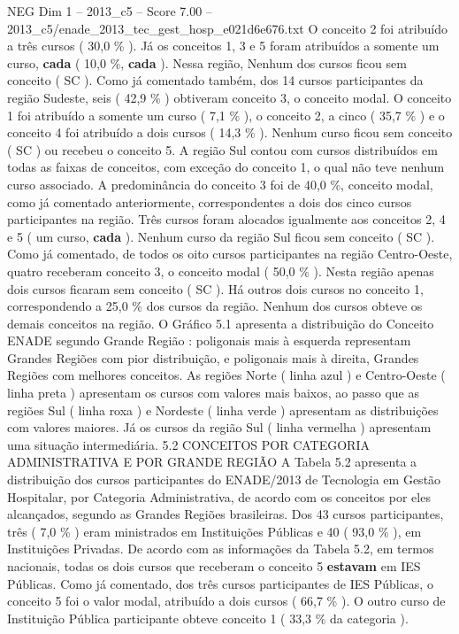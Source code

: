 \begin{textsample}{NEG Dim 1 – 2013\_c5 – Score 7.00 – 2013\_c5/enade\_2013\_tec\_gest\_hosp\_e021d6e676.txt}
O conceito 2 foi atribuído a três cursos ( 30,0 \% ).
Já os conceitos 1, 3 e 5 foram atribuídos a somente um curso, \textbf{cada} ( 10,0 \%, \textbf{cada} ).
Nessa região, Nenhum dos cursos ficou sem conceito ( SC ).
Como já comentado também, dos 14 cursos participantes da região Sudeste, seis ( 42,9 \% ) obtiveram conceito 3, o conceito modal.
O conceito 1 foi atribuído a somente um curso ( 7,1 \% ), o conceito 2, a cinco ( 35,7 \% ) e o conceito 4 foi atribuído a dois cursos ( 14,3 \% ).
Nenhum curso ficou sem conceito ( SC ) ou recebeu o conceito 5.
A região Sul contou com cursos distribuídos em todas as faixas de conceitos, com exceção do conceito 1, o qual não teve nenhum curso associado.
A predominância do conceito 3 foi de 40,0 \%, conceito modal, como já comentado anteriormente, correspondentes a dois dos cinco cursos participantes na região.
Três cursos foram alocados igualmente aos conceitos 2, 4 e 5 ( um curso, \textbf{cada} ).
Nenhum curso da região Sul ficou sem conceito ( SC ).
Como já comentado, de todos os oito cursos participantes na região Centro-Oeste, quatro receberam conceito 3, o conceito modal ( 50,0 \% ).
Nesta região apenas dois cursos ficaram sem conceito ( SC ).
Há outros dois cursos no conceito 1, correspondendo a 25,0 \% dos cursos da região.
Nenhum dos cursos obteve os demais conceitos na região.
O Gráfico 5.1 apresenta a distribuição do Conceito ENADE segundo Grande Região : poligonais mais à esquerda representam Grandes Regiões com pior distribuição, e poligonais mais à direita, Grandes Regiões com melhores conceitos.
As regiões Norte ( linha azul ) e Centro-Oeste ( linha preta ) apresentam os cursos com valores mais baixos, ao passo que as regiões Sul ( linha roxa ) e Nordeste ( linha verde ) apresentam as distribuições com valores maiores.
Já os cursos da região Sul ( linha vermelha ) apresentam uma situação intermediária. 5.2 CONCEITOS POR CATEGORIA ADMINISTRATIVA E POR GRANDE REGIÃO A Tabela 5.2 apresenta a distribuição dos cursos participantes do ENADE/2013 de Tecnologia em Gestão Hospitalar, por Categoria Administrativa, de acordo com os conceitos por eles alcançados, segundo as Grandes Regiões brasileiras.
Dos 43 cursos participantes, três ( 7,0 \% ) eram ministrados em Instituições Públicas e 40 ( 93,0 \% ), em Instituições Privadas.
De acordo com as informações da Tabela 5.2, em termos nacionais, todas os dois cursos que receberam o conceito 5 \textbf{estavam} em IES Públicas.
Como já comentado, dos três cursos participantes de IES Públicas, o conceito 5 foi o valor modal, atribuído a dois cursos ( 66,7 \% ).
O outro curso de Instituição Pública participante obteve conceito 1 ( 33,3 \% da categoria ).

\end{textsample}
